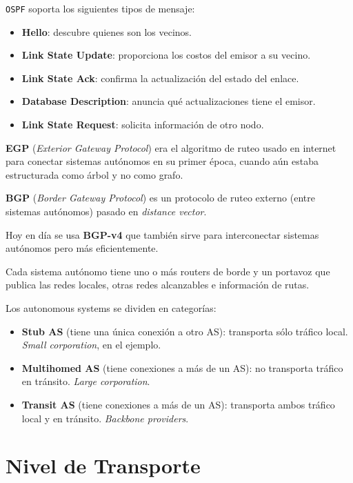 \documentclass[]{article}
\begin{document}
\texttt{OSPF} soporta los siguientes tipos de mensaje:
\begin{itemize}
    \item \textbf{Hello}: descubre quienes son los vecinos.
    \item \textbf{Link State Update}: proporciona los costos del emisor a su vecino.
    \item \textbf{Link State Ack}: confirma la actualización del estado del enlace.
    \item \textbf{Database Description}: anuncia qué actualizaciones tiene el emisor.
    \item \textbf{Link State Request}: solicita información de otro nodo.
\end{itemize}


\textbf{EGP} (\emph{Exterior Gateway Protocol}) era el algoritmo de ruteo usado en internet para conectar sistemas autónomos en su primer época, cuando aún estaba estructurada como árbol y no como grafo.

\textbf{BGP} (\emph{Border Gateway Protocol}) es un protocolo de ruteo externo (entre sistemas autónomos) pasado en \emph{distance vector}.


Hoy en día se usa \textbf{BGP-v4} que también sirve para interconectar sistemas autónomos pero más eficientemente.

Cada sistema autónomo tiene uno o más routers de borde y un portavoz que publica las redes locales, otras redes alcanzables e información de rutas.


Los autonomous systems se dividen en categorías:
\begin{itemize}
    \item \textbf{Stub AS} (tiene una única conexión a otro AS): transporta sólo tráfico local. \emph{Small corporation}, en el ejemplo.
    \item \textbf{Multihomed AS} (tiene conexiones a más de un AS): no transporta tráfico en tránsito. \emph{Large corporation}.
    \item \textbf{Transit AS} (tiene conexiones a más de un AS): transporta ambos tráfico local y en tránsito. \emph{Backbone providers}.
\end{itemize}


\section{Nivel de Transporte}
\end{document}
